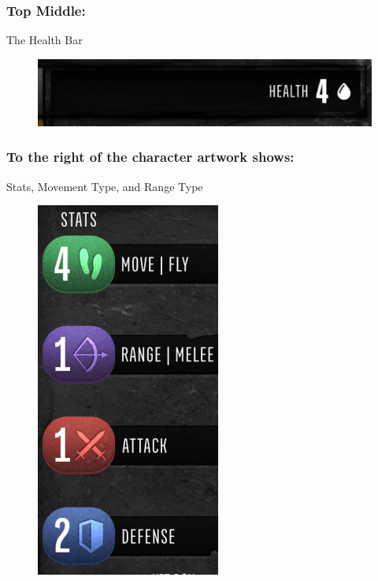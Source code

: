 \documentclass[../main.tex]{subfiles}
\begin{document}
\subsubsection{Top Middle:}
The Health Bar

\begin{figure}[ht]
    \includegraphics[width=0.8\linewidth]{chapters/charactercard/TimeStrikeCharCardHealth.png}
\end{figure}

\subsubsection{To the right of the character artwork shows:}
Stats, Movement Type, and Range Type
\begin{figure}[h]
    \includegraphics[width=0.3\linewidth]{chapters/charactercard/TimeStrikeCharCardStats.png}
\end{figure}
\end{document}

